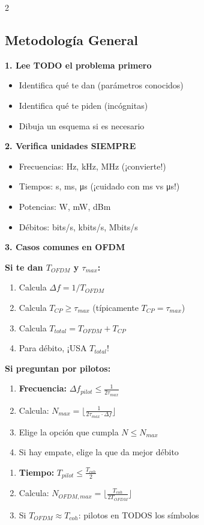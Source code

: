 \documentclass[10pt,a4paper]{article}
\begin{document}
\begin{multicols}{2}

\subsection{Metodología General}

\textbf{1. Lee TODO el problema primero}
\begin{itemize}
\item Identifica qué te dan (parámetros conocidos)
\item Identifica qué te piden (incógnitas)
\item Dibuja un esquema si es necesario
\end{itemize}

\textbf{2. Verifica unidades SIEMPRE}
\begin{itemize}
\item Frecuencias: Hz, kHz, MHz (¡convierte!)
\item Tiempos: s, ms, μs (¡cuidado con ms vs μs!)
\item Potencias: W, mW, dBm
\item Débitos: bits/s, kbits/s, Mbits/s
\end{itemize}

\textbf{3. Casos comunes en OFDM}

\textbf{Si te dan $T_{OFDM}$ y $\tau_{max}$:}
\begin{enumerate}
\item Calcula $\Delta f = 1/T_{OFDM}$
\item Calcula $T_{CP} \geq \tau_{max}$ (típicamente $T_{CP} = \tau_{max}$)
\item Calcula $T_{total} = T_{OFDM} + T_{CP}$
\item Para débito, ¡USA $T_{total}$!
\end{enumerate}

\textbf{Si preguntan por pilotos:}
\begin{enumerate}
\item \textbf{Frecuencia:} $\Delta f_{pilot} \leq \frac{1}{2\tau_{max}}$
\item Calcula: $N_{max} = \lfloor \frac{1}{2\tau_{max} \cdot \Delta f} \rfloor$
\item Elige la opción que cumpla $N \leq N_{max}$
\item Si hay empate, elige la que da mejor débito
\end{enumerate}

\begin{enumerate}[resume]
\item \textbf{Tiempo:} $T_{pilot} \leq \frac{T_{coh}}{2}$
\item Calcula: $N_{OFDM,max} = \lfloor \frac{T_{coh}}{2T_{OFDM}} \rfloor$
\item Si $T_{OFDM} \approx T_{coh}$: pilotos en TODOS los símbolos
\end{enumerate}


\end{multicols}
\end{document}
